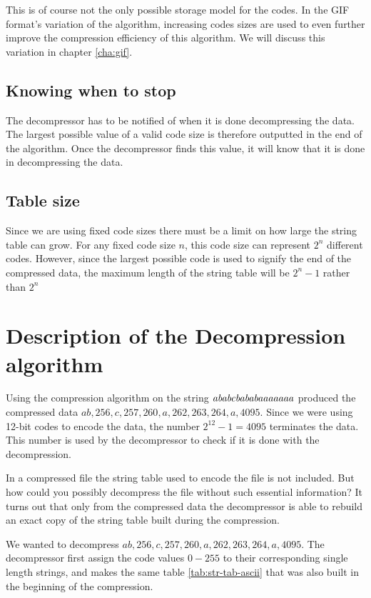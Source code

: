 This is of course not the only possible storage model for the
codes. In the GIF format's variation of the \lzw algorithm, increasing
codes sizes are used to even further improve the compression
efficiency of this algorithm. We will discuss this variation in chapter
\ref{cha:gif}.

\subsection{Knowing when to stop}

The decompressor has to be notified of when it is done decompressing
the data. The largest possible value of a valid code size is therefore
outputted in the end of the algorithm. Once the decompressor finds
this value, it will know that it is done in decompressing the data.

\subsection{Table size}

Since we are using fixed code sizes there must be a limit on how large
the string table can grow. For any fixed code size $n$, this code size
can represent $2^n$ different codes. However, since the largest
possible code is used to signify the end of the compressed data, the
maximum length of the string table will be $2^n - 1$ rather than $2^n$

\section{Description of the Decompression algorithm}

Using the compression algorithm \lzw on the string
$\mathit{ababcbababaaaaaaa}$ produced the compressed data $ab, 256,c,
257, 260, a, 262, 263, 264, a,4095$. Since we were using 12-bit codes
to encode the data, the number $2^{12} - 1 = 4095$ terminates the
data. This number is used by the decompressor to check if it is done
with the decompression.

In a \lzw compressed file the string table used to encode the file is
not included. But how could you possibly decompress the file without
such essential information? It turns out that only from the compressed
data the decompressor is able to rebuild an exact copy of the string
table built during the compression.

We wanted to decompress $ab, 256,c, 257, 260, a, 262, 263, 264,
a,4095$. The decompressor first assign the code values $0-255$ to
their corresponding single length strings, and makes the same table
\ref{tab:str-tab-ascii} that was also built in the beginning of the
compression.

